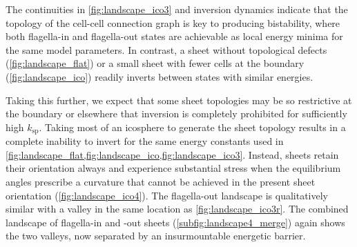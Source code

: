 The continuities in \cref{fig:landscape_ico3} and inversion dynamics indicate that the topology of the cell-cell connection graph is key to producing bistability, where both flagella-in and flagella-out states are achievable as local energy minima for the same model parameters.
In contrast, a sheet without topological defects (\cref{fig:landscape_flat}) or a small sheet with fewer cells at the boundary (\cref{fig:landscape_ico}) readily inverts between states with similar energies.

Taking this further, we expect that some sheet topologies may be so restrictive at the boundary or elsewhere that inversion is completely prohibited for sufficiently high $k_{\text{sp}}$. 
Taking most of an icosphere to generate the sheet topology results in a complete inability to invert for the same energy constants used in \cref{fig:landscape_flat,fig:landscape_ico,fig:landscape_ico3}.
Instead, sheets retain their orientation always and experience substantial stress when the equilibrium angles prescribe a curvature that cannot be achieved in the present sheet orientation (\cref{fig:landscape_ico4}).
The flagella-out landscape is qualitatively similar with a valley in the same location as \cref{fig:landscape_ico3r}.
The combined landscape of flagella-in and -out sheets (\cref{subfig:landscape4_merge}) again shows the two valleys, now separated by an insurmountable energetic barrier.

